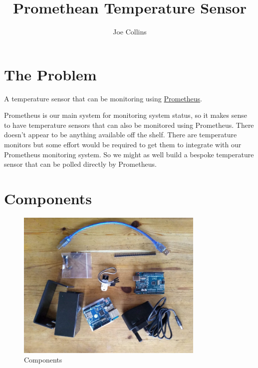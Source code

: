 \documentclass[a4paper, 12pt]{article}
\title{Promethean Temperature Sensor}
\author{Joe Collins}
\begin{document}
\maketitle
\tableofcontents

\section{The Problem}

A temperature sensor that can be monitoring using \href{https://prometheus.io/}{Prometheus}.

Prometheus is our main system for monitoring system status,
so it makes sense to have temperature sensors that can also be monitored using Prometheus.
There doesn't appear to be anything available off the shelf.
There are temperature monitors but some effort would be required to get 
them to integrate with our Prometheus monitoring system.
So we might as well build a bespoke temperature sensor
that can be polled directly by Prometheus.

\section{Components}

\begin{figure}[H]
  \centering
  \includegraphics[width=0.8\textwidth]{components.jpg}
  \caption{Components}
\end{figure}
\end{document}
